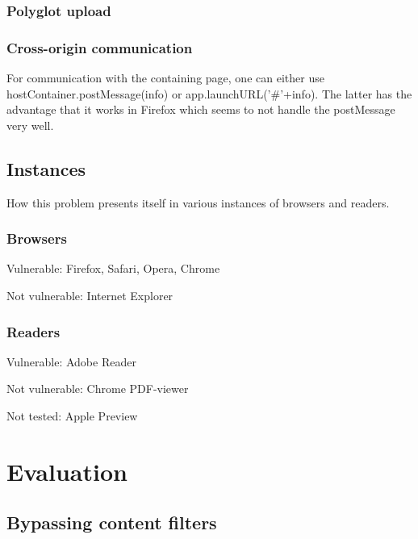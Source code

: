 \documentclass[10pt, conference, compsocconf]{IEEEtran}
\begin{document}
\subsubsection{Polyglot upload}



\subsubsection{Cross-origin communication}

For communication with the containing page, one can either use 
hostContainer.postMessage(info) or app.launchURL('\#'+info). The 
latter has the advantage that it works in Firefox which seems 
to not handle the postMessage very well.


\subsection{Instances}

How this problem presents itself in various instances of browsers and readers.


\subsubsection{Browsers}

Vulnerable: Firefox, Safari, Opera, Chrome

Not vulnerable: Internet Explorer


\subsubsection{Readers}

Vulnerable: Adobe Reader

Not vulnerable: Chrome PDF-viewer

Not tested: Apple Preview









\section{Evaluation}


\subsection{Bypassing content filters}
\end{document}
